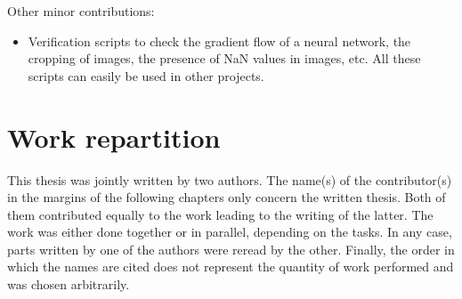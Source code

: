 Other minor contributions:
\begin{itemize}
\item Verification scripts to check the gradient flow of a neural network, the cropping of images, the presence of NaN values in images, etc. All these scripts can easily be used in other projects.
\end{itemize}


\section{Work repartition}

This thesis was jointly written by two authors. The name(s) of the contributor(s) in the margins of the following chapters only concern the written thesis. Both of them contributed equally to the work leading to the writing of the latter. The work was either done together or in parallel, depending on the tasks. In any case, parts written by one of the authors were reread by the other. Finally, the order in which the names are cited does not represent the quantity of work performed and was chosen arbitrarily. 